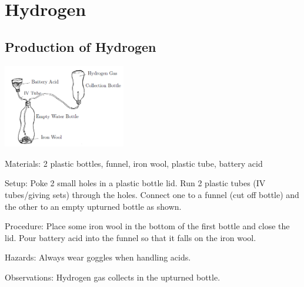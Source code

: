 \section{Hydrogen}

\begin{multicols}{2}




\subsection{Production of Hydrogen}

\begin{center}
\includegraphics[width=0.4\textwidth]{./img/hydrogen-production.png}
\end{center}

\begin{description*}
\item[Materials:]{2 plastic bottles, funnel, iron wool, plastic tube, battery acid}
\item[Setup:]{Poke 2 small holes in a plastic bottle lid. Run 2 plastic tubes (IV tubes/giving sets) through the holes. Connect one to a funnel (cut off bottle) and the other to an empty upturned bottle as shown. }
\item[Procedure:]{Place some iron wool in the bottom of the first bottle and close the lid. Pour battery acid into the funnel so that it falls on the iron wool.}
\item[Hazards:]{Always wear goggles when handling acids.}
\item[Observations:]{Hydrogen gas collects in the upturned bottle.}
\end{description*}


\end{multicols}
